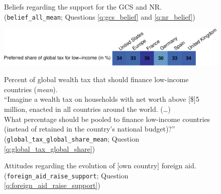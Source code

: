\documentclass[12pt,english]{article}
\begin{document}
\begin{bibunit}
  \begin{figure}[h!]
    \cprotect\caption[Beliefs about support for the GCS and NR]{Beliefs regarding the support for the GCS and NR. (\verb|belief_all_mean|; Questions \ref{q:gcs_belief} and \ref{q:nr_belief})}\label{fig:belief}
  \end{figure}
  
  \begin{figure}
    \centering 
    \cprotect\caption[Preferred share of wealth tax for low-income countries]{Percent of global wealth tax that should finance low-income countries (\textit{mean}). \\ ``Imagine a wealth tax on households with net worth above [\$]5 million, enacted in all countries around the world.  
    (\dots)  \\
    What percentage should be pooled to finance low-income countries (instead of retained in the country's national budget)?'' (\verb|global_tax_global_share_mean|; Question \ref{q:global_tax_global_share})} %
    \includegraphics[width=1\textwidth]{../figures/country_comparison/global_tax_global_share_mean.pdf} \label{fig:global_share_mean}
  \end{figure}
  
  \begin{figure}[h!]
    \cprotect\caption[Attitudes on the evolution of foreign aid]{Attitudes regarding the evolution of [own country] foreign aid. (\verb|foreign_aid_raise_support|; Question \ref{q:foreign_aid_raise_support})}\label{fig:foreign_aid_raise_support}
  \end{figure}
  

\end{bibunit}
\end{document}
